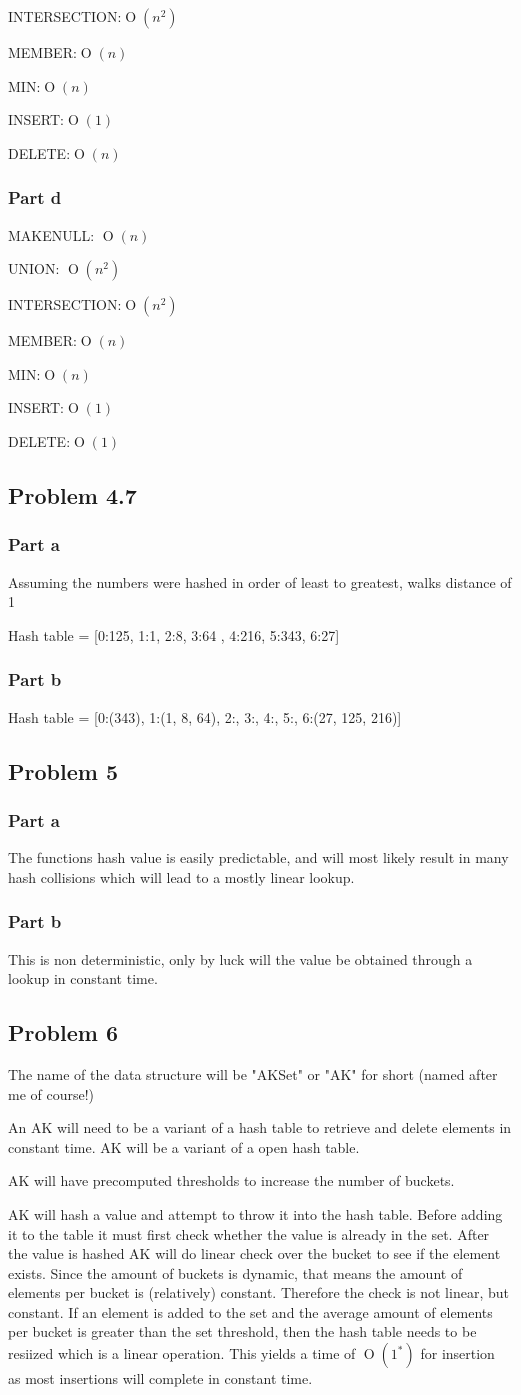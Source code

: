\documentclass[10pt,letterpaper,oneside]{article}
\newcommand{\Problem}[1]{\subsection*{Problem #1}}
\newcommand{\Part}[1]{\subsubsection*{Part #1}}
\DeclareMathOperator{\Omicron}{O}
\newcommand{\BigOh}[1]{\Omicron(#1)}
\begin{document}
INTERSECTION:$\BigOh{n^2}$

MEMBER:$\BigOh{n}$

MIN:$\BigOh{n}$

INSERT:$\BigOh{1}$

DELETE:$\BigOh{n}$

\Part{d}
MAKENULL: $\BigOh{n}$

UNION: $\BigOh{n^2}$

INTERSECTION:$\BigOh{n^2}$

MEMBER:$\BigOh{n}$

MIN:$\BigOh{n}$

INSERT:$\BigOh{1}$

DELETE:$\BigOh{1}$

\Problem{4.7}
\Part{a}
Assuming the numbers were hashed in order of least to greatest, walks distance of 1

Hash table = [0:125, 1:1, 2:8, 3:64 , 4:216, 5:343, 6:27]
\Part{b}

Hash table = [0:(343), 1:(1, 8, 64), 2:, 3:, 4:, 5:, 6:(27, 125, 216)]

\Problem{5}

\Part{a}

The functions hash value is easily predictable, and will most likely result in many hash collisions which will lead to a mostly linear lookup.

\Part{b}
This is non deterministic, only by luck will the value be obtained through a lookup in constant time. 

\Problem{6}
The name of the data structure will be "AKSet" or "AK" for short (named after me of course!)

An AK will need to be a variant of a hash table to retrieve and delete elements in constant time. AK will be a variant of a open hash table. 

AK will have precomputed thresholds to increase the number of buckets. 

AK will hash a value and attempt to throw it into the hash table. Before adding it to the table it must first check whether the value is already in the set. After the value is hashed AK will do linear check over the bucket to see if the element exists. Since the amount of buckets is dynamic, that means the amount of elements per bucket is (relatively) constant. Therefore the check is not linear, but constant. If an element is added to the set and the average amount of elements per bucket is greater than the set threshold, then the hash table needs to be resiized which is a linear operation. This yields a time of $\BigOh{1^*}$ for insertion as most insertions will complete in constant time. 
\end{document}
